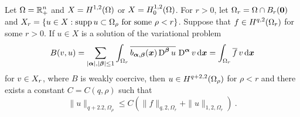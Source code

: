 \begin{prop} \label{ell_regular_Rnp}
Let $\displaystyle \Omega = \mathbb{R}^n_+$ and
$\displaystyle X = H^{1,2}(\Omega)$ or
$\displaystyle X = H^{1,2}_0(\Omega)$.  For $r>0$, let
$\displaystyle \Omega_r = \Omega \cap B_r({\bm{0}})$
and
$\displaystyle X_r = \left\{ u \in X : \operatorname{supp} u \subset \Omega_\rho \
\text{for some} \ \rho <r \right\}$.
Suppose that $\displaystyle f \in H^{q,2}(\Omega_r)$ for some $r>0$.
If $u\in X$ is a solution of the variational problem
\begin{equation} \label{ell_var_reg}
B(v,u) =
\sum_{|{\bm{\alpha}}|,|{\bm{\beta}}|\leq 1}
\int_{\Omega_r} \overline{b_{{\bm{\alpha}},{\bm{\beta}}}({\bm{x}})
\operatorname{D}^{{\bm{\beta}}} u}\, \operatorname{D}^{{\bm{\alpha}}} v
\,\mathrm{d}{{\bm{x}}} = \int_{\Omega_r} \overline{f}\,v \,\mathrm{d}{{\bm{x}}}
\end{equation}
for $\displaystyle v \in X_r$, where $B$ is weakly coercive, then
$\displaystyle u\in H^{q+2,2}(\Omega_\rho)$ for
$\rho<r$ and there exists a constant $C = C(q,\rho)$ such that
\[
\|u\|_{q+2.2,\Omega_\rho} \leq C \left( \|f\|_{q,2,\Omega_r} +
\|u\|_{1,2,\Omega_r} \right) \ .
\]
\end{prop}

